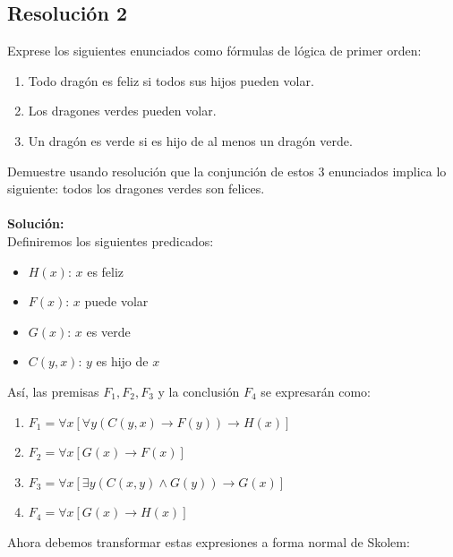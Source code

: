 \documentclass{article}
\begin{document}
\newpage


\subsection{Resolución 2}
Exprese los siguientes enunciados como fórmulas de lógica de primer orden:
\begin{enumerate}
  \item Todo dragón es feliz si todos sus hijos pueden volar.
  \item Los dragones verdes pueden volar.
  \item Un dragón es verde si es hijo de al menos un dragón verde.
\end{enumerate}

Demuestre usando resolución que la conjunción de estos 3 enunciados implica lo
siguiente: todos los dragones verdes son felices.\\ \\


\textbf{Solución:}\\
Definiremos los siguientes predicados:

\begin{itemize}
  \item $H(x)$: $x$ es feliz
  \item $F(x)$: $x$ puede volar
  \item $G(x)$: $x$ es verde
  \item $C(y, x)$: $y$ es hijo de $x$
\end{itemize}

Así, las premisas $F_{1}, F_{2}, F_{3}$ y la conclusión $F_{4}$ se expresarán
como:

\begin{enumerate}
  \item $F_{1} = \forall x [\forall y (C(y, x) \rightarrow F(y)) \rightarrow H(x)]$
  \item $F_{2} = \forall x [G(x) \rightarrow F(x)]$
  \item $F_{3} = \forall x [\exists y (C(x,y) \land G(y)) \rightarrow G(x)]$
  \item $F_{4} = \forall x [G(x) \rightarrow H(x)]$
\end{enumerate}

Ahora debemos transformar estas expresiones a forma normal de Skolem:
\end{document}
